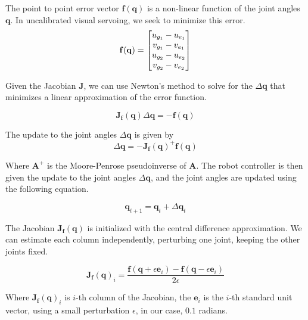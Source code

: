 \documentclass[letterpaper, 10 pt, conference]{ieeeconf}  %
\begin{document}
The point to point
error vector $\mathbf{f}(\mathbf{q})$ is a non-linear function of the joint angles
$\mathbf{q}$. In uncalibrated visual servoing, we seek to minimize this error.
\begin{equation}
    \mathbf{f}(\mathbf{q}) = \begin{bmatrix}
        u_{g_1} - u_{e_1} \cr
        v_{g_1} - v_{e_1} \cr
        u_{g_2} - u_{e_2} \cr
        v_{g_2} - v_{e_2}
    \end{bmatrix}
\end{equation}

Given the Jacobian $\mathbf{J}$, we can use Newton's method to solve
for the $\Delta \mathbf{q}$ that minimizes a linear approximation of the error
function.

\begin{equation}
    \mathbf{J}_{\mathbf{f}}(\mathbf{q}) \Delta \mathbf{q} = -\mathbf{f}(\mathbf{q})
\end{equation}

The update to the joint angles $\Delta \mathbf{q}$ is given by
\begin{equation}
    \Delta \mathbf{q} = -\mathbf{J}_{\mathbf{f}}(\mathbf{q})^{+} \mathbf{f}(\mathbf{q})
\end{equation}

Where $\mathbf{A}^{+}$ is the Moore-Penrose pseudoinverse of $\mathbf{A}$. The
robot controller is then given the update to the joint angles $\Delta \mathbf{q}$,
and the joint angles are updated using the following equation.

\begin{equation}
    \mathbf{q}_{t+1} = \mathbf{q}_t + \Delta \mathbf{q}_t
\end{equation}

The Jacobian $\mathbf{J}_{\mathbf{f}}(\mathbf{q})$ is initialized with the
central difference approximation. We can estimate each column independently,
perturbing one joint, keeping the other joints fixed.

\begin{equation}
    \mathbf{J}_{\mathbf{f}}(\mathbf{q})_i = \frac{\mathbf{f}(\mathbf{q} + \epsilon \mathbf{e}_i) - \mathbf{f}(\mathbf{q} - \epsilon \mathbf{e}_i)}{2 \epsilon}
\end{equation}

Where $\mathbf{J}_{\mathbf{f}}(\mathbf{q})_i$ is $i$-th column of the Jacobian,
the $\mathbf{e}_i$ is the $i$-th standard unit vector, using a small
perturbation $\epsilon$, in our case, $0.1$ radians.
\end{document}
